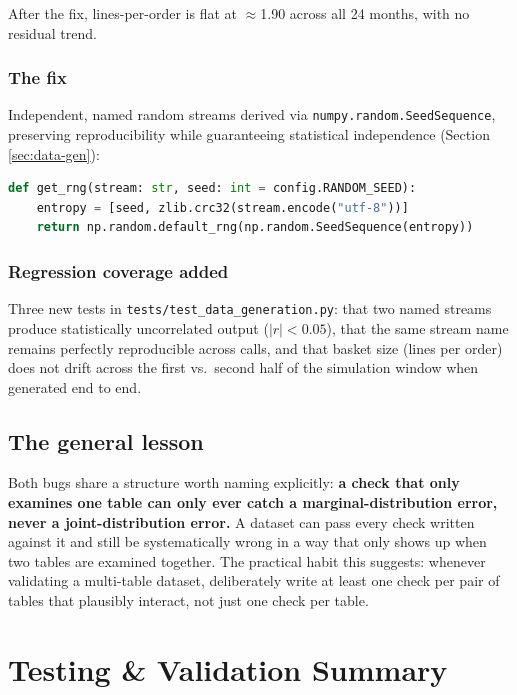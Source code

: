 \documentclass[11pt,a4paper]{report}
\begin{document}
After the fix, lines-per-order is flat at $\approx$1.90 across all 24
months, with no residual trend.

\subsection*{The fix}
Independent, named random streams derived via \texttt{numpy.random.SeedSequence},
preserving reproducibility while guaranteeing statistical independence
(Section \ref{sec:data-gen}):
\begin{lstlisting}[language=Python]
def get_rng(stream: str, seed: int = config.RANDOM_SEED):
    entropy = [seed, zlib.crc32(stream.encode("utf-8"))]
    return np.random.default_rng(np.random.SeedSequence(entropy))
\end{lstlisting}

\subsection*{Regression coverage added}
Three new tests in \texttt{tests/test\_data\_generation.py}: that two named
streams produce statistically uncorrelated output ($|r| < 0.05$), that the
same stream name remains perfectly reproducible across calls, and that
basket size (lines per order) does not drift across the first vs.\ second
half of the simulation window when generated end to end.

\section{The general lesson}

Both bugs share a structure worth naming explicitly: \textbf{a check that
only examines one table can only ever catch a marginal-distribution error,
never a joint-distribution error.} A dataset can pass every check written
against it and still be systematically wrong in a way that only shows up
when two tables are examined together. The practical habit this suggests:
whenever validating a multi-table dataset, deliberately write at least one
check per pair of tables that plausibly interact, not just one check per
table.

\chapter{Testing \& Validation Summary}
\end{document}
